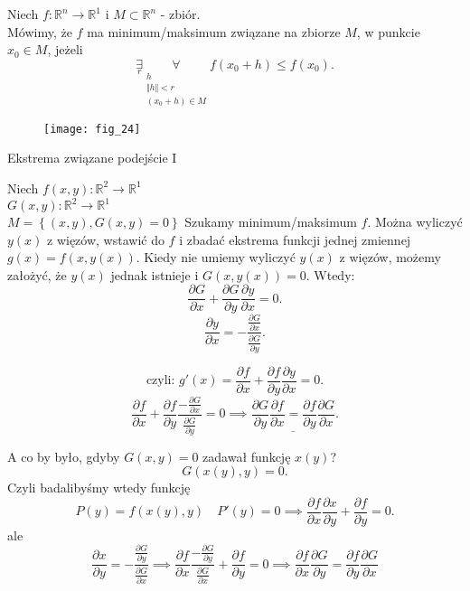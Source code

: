 \documentclass[../main.tex]{subfiles}
\begin{document}
    \begin{definicja}
        Niech $f:\mathbb{R}^{n}\to\mathbb{R}^1$ i $M\subset \mathbb{R}^n$ - zbiór.\\
        Mówimy, że $f$ ma minimum/maksimum związane na zbiorze $M$, w punkcie $x_0\in M$, jeżeli
        \[
            \underset{r}{\exists} \underset{\substack{h\\  \Vert h \Vert < r \\ (x_0+h)\in M}}{\forall} f(x_0+h)\leq f(x_0)
    .\]
    \end{definicja}
    \begin{figure}
        \centering
        \texttt{[image: fig\_24]}
        \caption{}
        \label{fig:fig_24}
    \end{figure}

    \begin{large}
        Ekstrema związane podejście I\\
    \end{large}

    \vspace{1cm}

    Niech $f(x,y):\mathbb{R}^2\to\mathbb{R}^1$ \\
    $G(x,y): \mathbb{R}^2\to\mathbb{R}^1$\\
    $M = \left\{ (x,y), G(x,y) = 0 \right\} $
    Szukamy minimum/maksimum $f$. Można wyliczyć $y(x)$ z więzów, wstawić do $f$ i zbadać ekstrema funkcji jednej zmiennej $g(x) = f(x,y(x))$.
    Kiedy nie umiemy wyliczyć $y(x)$ z więzów, możemy założyć, że $y(x)$ jednak istnieje i $G(x,y(x)) = 0$. Wtedy:
    \[
    \frac{\partial G}{\partial x} + \frac{\partial G}{\partial y} \frac{\partial y}{\partial x} = 0
    .\]
    \[
        \frac{\partial y}{\partial x}  = - \frac{\frac{\partial G}{\partial x}}{\frac{\partial G}{\partial y} }
    .\]

    \[
        \text{czyli: } g'(x) = \frac{\partial f}{\partial x} + \frac{\partial f}{\partial y} \frac{\partial y}{\partial x} = 0
    .\]
    \[
        \frac{\partial f}{\partial x} + \frac{\partial f}{\partial y} \frac{-\frac{\partial G}{\partial x}}{\frac{\partial G}{\partial y} } = 0
        \implies \underline{\frac{\partial G}{\partial y} \frac{\partial f}{\partial x} = \frac{\partial f}{\partial y} \frac{\partial G}{\partial x}}
    .\]

    A co by było, gdyby $G(x,y) = 0$ zadawał funkcję $x(y)$?\\
    \[
        G(x(y),y) = 0
    .\]
    Czyli badalibyśmy wtedy funkcję \[
        P(y) = f(x(y),y)\quad P'(y) = 0 \implies \frac{\partial f}{\partial x} \frac{\partial x}{\partial y} + \frac{\partial f}{\partial y}  = 0
    .\]
    ale
    \begin{equation}\label{eq:eqx}
        \frac{\partial x}{\partial y}  = - \frac{\frac{\partial G}{\partial y}}{\frac{\partial G}{\partial x}} \implies \frac{\partial f}{\partial x} \frac{-\frac{\partial G}{\partial y} }{\frac{\partial G}{\partial x} }+\frac{\partial f}{\partial y} = 0 \implies \frac{\partial f}{\partial x} \frac{\partial G}{\partial y} = \frac{\partial f}{\partial y} \frac{\partial G}{\partial x}
    \end{equation}
\end{document}
